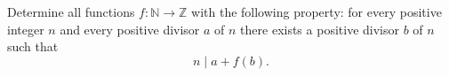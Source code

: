 Determine all functions $f\colon \mathbb{N} \to \mathbb{Z}$ with the following property:
for every positive integer $n$ and every positive divisor $a$ of $n$
there exists a positive divisor $b$ of $n$ such that 
\[
    n \mid a + f(b).
\]
